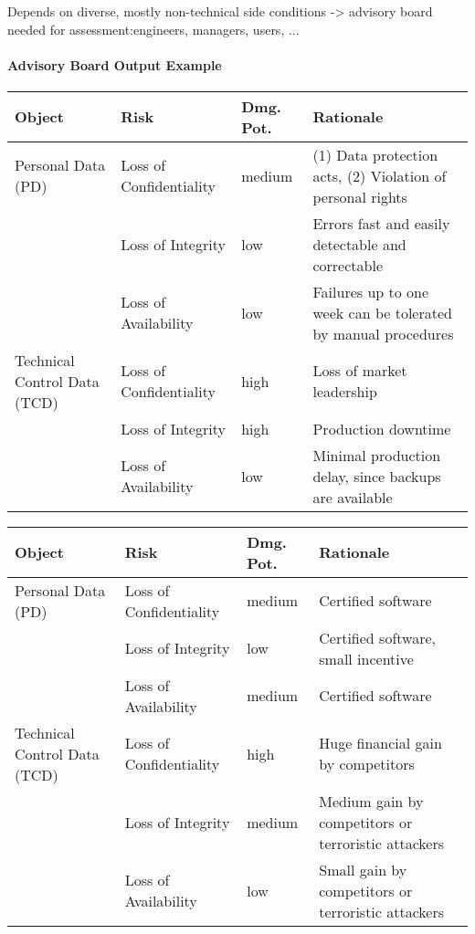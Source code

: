 \documentclass[a4paper]{article}
\begin{document}
\begin{multicols}{3}
    Depends on diverse, mostly non-technical side conditions ->  advisory board needed for assessment:engineers, managers, users, ...



    \paragraph{Advisory Board Output Example}
    \begin{tabular}{l|l|l|l}
        Object                       & Risk                    & Dmg. Pot. & Rationale                                                     \\\hline
        Personal Data (PD)           & Loss of Confidentiality & medium    & (1) Data protection acts, (2) Violation of personal rights    \\
                                     & Loss of Integrity       & low       & Errors fast and easily detectable and correctable             \\
                                     & Loss of Availability    & low       & Failures up to one week can be tolerated by manual procedures \\
        Technical Control Data (TCD) & Loss of Confidentiality & high      & Loss of market leadership                                     \\
                                     & Loss of Integrity       & high      & Production downtime                                           \\
                                     & Loss of Availability    & low       & Minimal production delay, since backups are available
    \end{tabular}
    \begin{tabular}{l|l|l|l}
        Object                       & Risk                    & Dmg. Pot. & Rationale                                           \\\hline
        Personal Data (PD)           & Loss of Confidentiality & medium    & Certified software                                  \\
                                     & Loss of Integrity       & low       & Certified software, small incentive                 \\
                                     & Loss of Availability    & medium    & Certified software                                  \\
        Technical Control Data (TCD) & Loss of Confidentiality & high      & Huge financial gain by competitors                  \\
                                     & Loss of Integrity       & medium    & Medium gain by competitors or terroristic attackers \\
                                     & Loss of Availability    & low       & Small gain by competitors or terroristic attackers
    \end{tabular}


\end{multicols}
\end{document}
